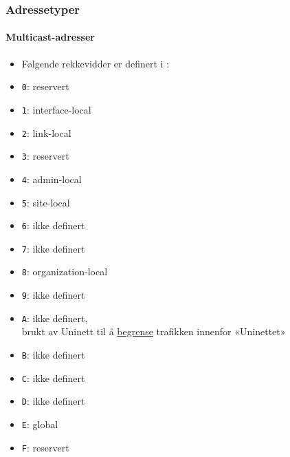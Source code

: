\begin{frame}[fragile]%
  \frametitle{Adressetyper}
  \framesubtitle{Multicast-adresser}
  \begin{multicols}{2}
    \begin{itemize}[<+->]
    \item Følgende rekkevidder er definert i :
    \item \texttt{0}: reservert
    \item \texttt{1}: interface-local
    \item \texttt{2}: link-local
    \item \texttt{3}: reservert
    \item \texttt{4}: admin-local
    \item \texttt{5}: site-local
    \item \texttt{6}: ikke definert
    \item \texttt{7}: ikke definert
    \item \texttt{8}: organization-local
    \item \texttt{9}: ikke definert
    \item \texttt{A}: ikke definert,\\ brukt av Uninett til å
      \href{http://drift.uninett.no/nett/ip-nett/ipv6-multicastadresser.html}{begrense}
      trafikken innenfor «Uninettet»
    \item \texttt{B}: ikke definert
    \item \texttt{C}: ikke definert
    \item \texttt{D}: ikke definert
    \item \texttt{E}: global
    \item \texttt{F}: reservert
    \end{itemize}
  \end{multicols}
\end{frame}

